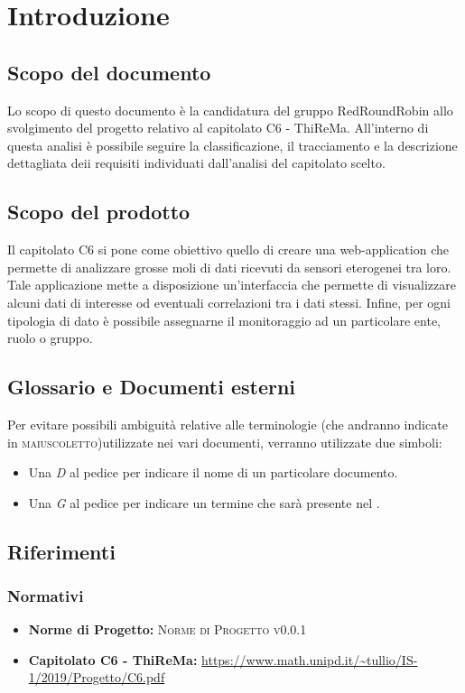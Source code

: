 \section{Introduzione}
	\subsection{Scopo del documento}
		Lo scopo di questo documento è la candidatura del gruppo RedRoundRobin allo svolgimento del progetto relativo al capitolato C6 - ThiReMa.
		All'interno di questa analisi è  possibile seguire la classificazione, il tracciamento e la descrizione dettagliata deii requisiti individuati dall'analisi del capitolato scelto.
	\subsection{Scopo del prodotto}
		Il capitolato C6 si pone come obiettivo quello di creare una web-application che permette di analizzare grosse moli di dati ricevuti da sensori eterogenei tra loro. Tale applicazione mette a disposizione un'interfaccia che permette di visualizzare alcuni dati di interesse od eventuali correlazioni tra i dati stessi. Infine, per ogni tipologia di dato è possibile assegnarne il monitoraggio ad un particolare ente, ruolo o gruppo.
	\subsection{Glossario e Documenti esterni}
		Per evitare possibili ambiguità relative alle terminologie (che andranno indicate in \textsc{maiuscoletto})utilizzate nei vari documenti, verranno utilizzate due simboli:
		\begin{itemize}
			\item Una \textit{D} al pedice per indicare il nome di un particolare documento.
			\item Una \textit{G} al pedice per indicare un termine che sarà presente nel .
		\end{itemize}
	\subsection{Riferimenti}
		\subsubsection{Normativi}
			\begin{itemize}
				\item \textbf{Norme di Progetto: }\textsc{Norme di Progetto v0.0.1} 
				\item \textbf{Capitolato C6 - ThiReMa: }\url{https://www.math.unipd.it/~tullio/IS-1/2019/Progetto/C6.pdf}
			\end{itemize}
